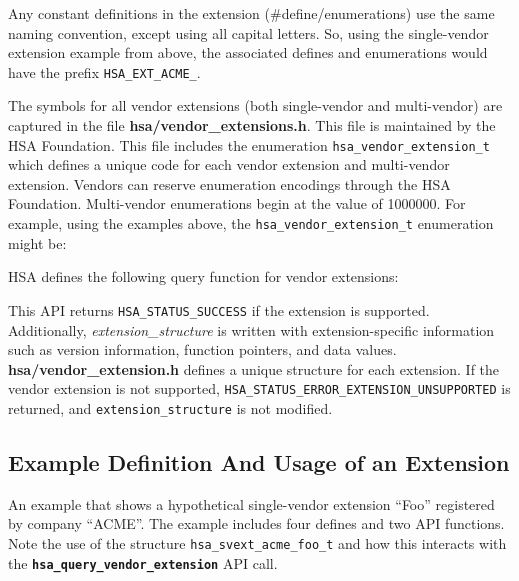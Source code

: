 \documentclass{book}
\newcommand{\diffblock}[1]{#1}
\newcommand{\ttbf}[1]{\diffblock{\texttt{\textbf{#1}}}}
\begin{document}
Any constant definitions in the extension (\#define/enumerations) use
the same naming convention, except using all capital letters. So,
using the single-vendor extension example from above, the associated
defines and enumerations would have the prefix
\texttt{HSA\_EXT\_ACME\_}.

The symbols for all vendor extensions (both single-vendor and
multi-vendor) are captured in the file {\bf hsa/vendor\_extensions.h}.
This file is maintained by the HSA Foundation.  This file includes
the enumeration \texttt{hsa\_vendor\_extension\_t} which defines a
unique code for each vendor extension and multi-vendor extension.
Vendors can reserve enumeration encodings through the HSA
Foundation. Multi-vendor enumerations begin at the value of
1000000. For example, using the examples above, the
\texttt{hsa\_vendor\_extension\_t} enumeration might be:



HSA defines the following query function for vendor extensions:



This API returns \texttt{HSA\_STATUS\_SUCCESS} if the extension is
supported.  Additionally, {\itshape extension\_structure} is written
with extension-specific information such as version information,
function pointers, and data values.  {\bf hsa/vendor\_extension.h} defines
a unique structure for each extension.  If the vendor extension is
not supported, \texttt{HSA\_STATUS\_ERROR\_EXTENSION\_UNSUPPORTED}
is returned, and \texttt{extension\_structure} is not modified.

\subsection{Example Definition And Usage of an Extension}
An example that shows a hypothetical single-vendor extension ``Foo''
registered by company ``ACME''.  The example includes four defines
and two API functions.  Note the use of the structure
\texttt{hsa\_svext\_acme\_foo\_t} and how this interacts with the
\ttbf{hsa\_query\_vendor\_extension} API call.


\end{document}
